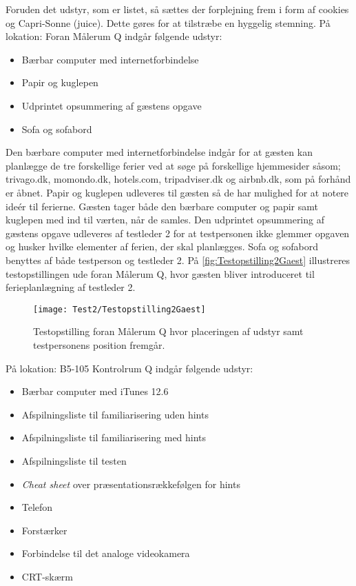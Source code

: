 Foruden det udstyr, som er listet, så sættes der forplejning frem i form af cookies og Capri-Sonne (juice). Dette gøres for at tilstræbe en hyggelig stemning. \blankline  
%
På lokation: Foran Målerum Q indgår følgende udstyr: 
\begin{itemize}
  \item Bærbar computer med internetforbindelse 
  \item Papir og kuglepen 
  \item Udprintet opsummering af gæstens opgave
  \item Sofa og sofabord\blankline
\noindent
\end{itemize}
%
Den bærbare computer med internetforbindelse indgår for at gæsten kan planlægge de tre forskellige ferier ved at søge på forskellige hjemmesider såsom; trivago.dk, momondo.dk, hotels.com, tripadviser.dk og airbnb.dk, som på forhånd er åbnet. Papir og kuglepen udleveres til gæsten så de har mulighed for at notere ideér til ferierne. Gæsten tager både den bærbare computer og papir samt kuglepen med ind til værten, når de samles. Den udprintet opsummering af gæstens opgave udleveres af testleder 2 for at testpersonen ikke glemmer opgaven og husker hvilke elementer af ferien, der skal planlægges. Sofa og sofabord benyttes af både testperson og testleder 2. På \autoref{fig:Testopstilling2Gaest} illustreres testopstillingen ude foran Målerum Q, hvor gæsten bliver introduceret til ferieplanlægning af testleder 2.  
%
\begin{figure}[H]
	\centering
	\texttt{[image: Test2/Testopstilling2Gaest]}
	\caption{Testopstilling foran Målerum Q hvor placeringen af udstyr samt testpersonens position fremgår.}
	\label{fig:Testopstilling2Gaest}
\end{figure}
\noindent
% 
På lokation: B5-105 Kontrolrum Q indgår følgende udstyr:
\begin{itemize}
  \item Bærbar computer med iTunes 12.6
  \item Afspilningsliste til familiarisering uden hints 
  \item Afspilningsliste til familiarisering med hints
  \item Afspilningsliste til testen
  \item \textit{Cheat sheet} over præsentationsrækkefølgen for hints 
  \item Telefon
  \item Forstærker 
  \item Forbindelse til det analoge videokamera
  \item CRT-skærm \blankline
\noindent
\end{itemize}
